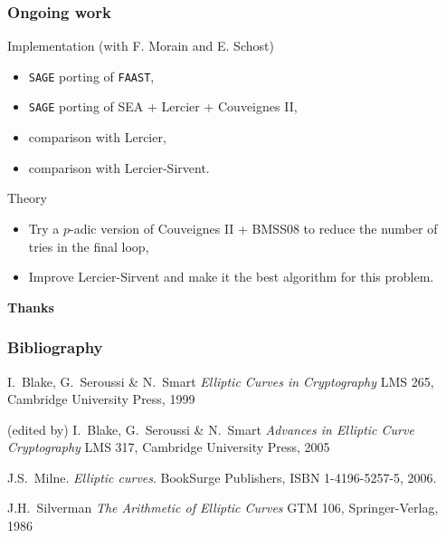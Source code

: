 \documentclass[10pt]{beamer}
\newcommand{\0}{\mathcal{O}}  %
\begin{document}

\begin{frame}
  \frametitle{Ongoing work}

  \begin{block}{Implementation (with F. Morain and E. Schost)}
    \begin{itemize}
    \item \texttt{SAGE} porting of \texttt{FAAST},
    \item \texttt{SAGE} porting of SEA + Lercier + Couveignes II,
    \item comparison with Lercier,
    \item comparison with Lercier-Sirvent.
    \end{itemize}
  \end{block}

  \begin{block}{Theory}
    \begin{itemize}
    \item Try a $p$-adic version of Couveignes II + BMSS08 to reduce
      the number of tries in the final loop,
    \item Improve Lercier-Sirvent and make it the best algorithm for
      this problem.
    \end{itemize}
  \end{block}
\end{frame}


\begin{frame}
  \begin{center}
    \Large
    \textbf{Thanks}
  \end{center}
\end{frame}


\begin{frame}
  \frametitle{Bibliography}

  \begin{thebibliography}{1}
    \beamertemplatebookbibitems
    
   I.~Blake, G.~Seroussi \& N.~Smart
    \newblock \emph{Elliptic Curves in Cryptography}
    \newblock LMS 265, Cambridge University Press, 1999
    
   (edited by) I.~Blake, G.~Seroussi \& N.~Smart
    \newblock \emph{Advances in Elliptic Curve Cryptography}
    \newblock LMS 317, Cambridge University Press, 2005
        
   J.S.~Milne.
    \newblock \emph{Elliptic curves}.
    \newblock BookSurge Publishers, ISBN 1-4196-5257-5, 2006.

   J.H.~Silverman
    \newblock \emph{The Arithmetic of Elliptic Curves}
    \newblock GTM 106, Springer-Verlag, 1986
        
  \end{thebibliography}
\end{frame}
\end{document}
